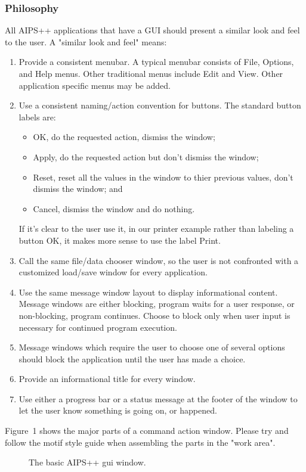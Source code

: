 \subsubsection{Philosophy}
All AIPS++ applications that have a GUI should present a similar look
and feel to the user.  A "similar look and feel" means:
\begin{enumerate}
\item Provide a consistent menubar.  A typical menubar consists of File, Options, and Help menus.  Other traditional menus include Edit and View.  Other 
application specific menus may be added.
\item Use a consistent naming/action convention for buttons.  The standard 
button labels are:
\begin{itemize}
\item OK, do the requested action, dismiss the window;
\item Apply, do the requested action but don't dismiss the window;
\item Reset, reset all the values in the window to thier previous values,
don't dismiss the window; and
\item Cancel, dismiss the window and do nothing.
\end{itemize}
If it's clear to the user use it, in our
printer example rather
than labeling a button OK, it makes more sense to use the label Print.
\item Call the same file/data chooser window, so the user is not confronted
with a customized load/save window for every application.
\item Use the same message window layout to display informational content.  
Message windows are either blocking, program waits for a user response, or non-blocking, program continues.  Choose to block only when user input is necessary
for continued program execution.
\item Message windows which require the user to choose one of several options
should block the application until the user has made a choice.
\item Provide an informational title for every window.
\item Use either a progress bar or a status message at the footer of the window
to let the user know something is going on, or happened.
\end{enumerate}
Figure~1 shows the major parts of a command action window.  Please try and
follow the motif style guide when assembling the parts in the "work area".
\begin{figure}[here]
\caption{The basic AIPS++ gui window.}
\end{figure}
